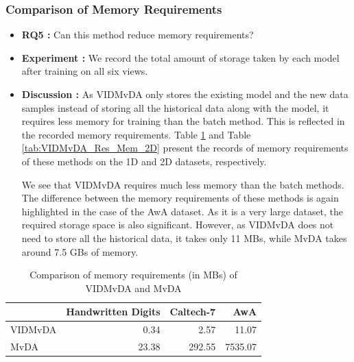 \subsubsection{Comparison of Memory Requirements}
\label{ssubs:VIDMvDA_Memory}
\begin{itemize}
\item \textbf{RQ5 :}
Can this method reduce memory requirements?

\item \textbf{Experiment :}
We record the total amount of storage taken by each model after training on all six views.

\item \textbf{Discussion :}
As VIDMvDA only stores the existing model and the new data samples instead of storing all the historical data along with the model, it requires less memory for training than the batch method. This is reflected in the recorded memory requirements. Table \ref{tab:VIDMvDA_Res_Mem} and Table \ref{tab:VIDMvDA_Res_Mem_2D} present the records of memory requirements of these methods on the 1D and 2D datasets, respectively.

We see that VIDMvDA requires much less memory than the batch methods. The difference between the memory requirements of these methods is again highlighted in the case of the AwA dataset. As it is a very large dataset, the required storage space is also significant. However, as VIDMvDA does not need to store all the historical data, it takes only 11 MBs, while MvDA takes around 7.5 GBs of memory.
\end{itemize}

\begin{table}[t]
	\centering
	\caption{Comparison of memory requirements (in MBs) of VIDMvDA and MvDA}
	\label{tab:VIDMvDA_Res_Mem}
	\begin{tabular}{l r r r} \toprule
		
		 & \textbf{Handwritten Digits} & \textbf{Caltech-7} & \textbf{AwA} \\ \midrule
		VIDMvDA &  0.34 \hspace{1.4cm} &   2.57 \hspace{0.3cm} & 11.07 \\ 
		MvDA    & 23.38 \hspace{1.4cm} & 292.55 \hspace{0.3cm} & 7535.07 \\ \bottomrule
	
	\end{tabular}
\end{table}


